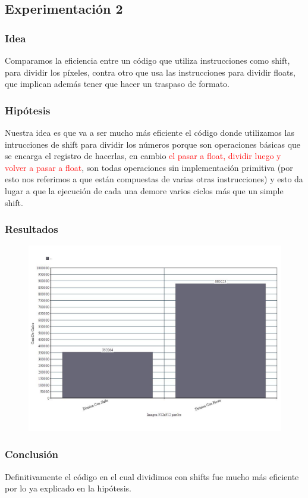 \subsection{Experimentación 2}
\subsubsection{Idea}
\par{Comparamos la eficiencia entre un código que utiliza instrucciones como shift, para dividir los píxeles, contra otro que usa las instrucciones para dividir floats, que implican además tener que hacer un traspaso de formato.}

\subsubsection{Hipótesis}
\par{Nuestra idea es que va a ser mucho más eficiente el código donde utilizamos las intrucciones de shift para dividir los números porque son operaciones básicas que se encarga el registro de hacerlas, en cambio \textcolor{red}{el pasar a float, dividir luego y volver a pasar a float}, son todas operaciones sin implementación primitiva (por esto nos referimos a que están compuestas de varias otras instrucciones) y esto da lugar a que la ejecución de cada una demore varios ciclos más que un simple shift.}

\subsubsection{Resultados}
	\begin{figure}[!h]
	\includegraphics[width = 15 cm, height = 10 cm]{imagenes/Div_pixelar.jpg}
	\end{figure}
	
\subsubsection{Conclusión}
\par{Definitivamente el código en el cual dividimos con shifts fue mucho más eficiente por lo ya explicado en la hipótesis.}